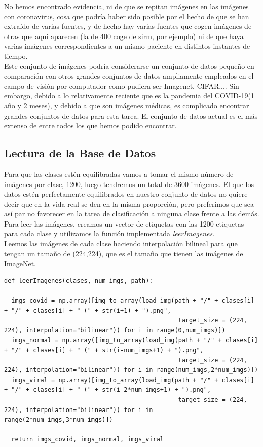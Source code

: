 \documentclass[11pt,a4paper]{article}
\theoremstyle{definition}
\begin{document}
No hemos encontrado evidencia,  ni de que se repitan imágenes en las imágenes con coronavirus,  cosa que podría haber sido posible por el hecho de que se han extraído de varias fuentes,  y de hecho hay varias fuentes que cogen imágenes de otras que aquí aparecen (la de 400 coge de sirm,  por ejemplo) ni de que haya varias imágenes correspondientes a un mismo paciente en distintos instantes de tiempo. \\

Este conjunto de imágenes podría considerarse un conjunto de datos pequeño en comparación con otros grandes conjuntos de datos ampliamente empleados en el campo de visión por computador como pudiera ser Imagenet, CIFAR,...  Sin embargo, debido a lo relativamente reciente que es la pandemia del COVID-19(1 año y 2 meses),  y debido a que son imágenes médicas, es complicado encontrar grandes conjuntos de datos para esta tarea. El conjunto de datos actual es el más extenso de entre todos los que hemos podido encontrar.

\subsection{Lectura de la Base de Datos}

Para que las clases estén equilibradas vamos a tomar el mismo número de imágenes por clase, 1200, luego tendremos un total de 3600 imágenes.  El que los datos estén perfectamente equilibrados en nuestro conjunto de datos no quiere decir que en la vida real se den en la misma proporción,  pero preferimos que sea así par no favorecer en la tarea de clasificación a ninguna clase frente a las demás.\\

Para leer las imágenes, creamos un vector de etiquetas con las 1200 etiquetas para cada clase y utilizamos la función implementada \textit{leerImagenes}.\\

Leemos las imágenes de cada clase haciendo interpolación bilineal para que tengan un tamaño de (224,224), que es el tamaño que tienen las imágenes de ImageNet.\\
\begin{lstlisting}
def leerImagenes(clases, num_imgs, path):

  imgs_covid = np.array([img_to_array(load_img(path + "/" + clases[i] + "/" + clases[i] + " (" + str(i+1) + ").png",
                                                target_size = (224, 224), interpolation="bilinear")) for i in range(0,num_imgs)])
  imgs_normal = np.array([img_to_array(load_img(path + "/" + clases[i] + "/" + clases[i] + " (" + str(i-num_imgs+1) + ").png",
                                                target_size = (224, 224), interpolation="bilinear")) for i in range(num_imgs,2*num_imgs)])
  imgs_viral = np.array([img_to_array(load_img(path + "/" + clases[i] + "/" + clases[i] + " (" + str(i-2*num_imgs+1) + ").png",
                                                target_size = (224, 224), interpolation="bilinear")) for i in range(2*num_imgs,3*num_imgs)])

  return imgs_covid, imgs_normal, imgs_viral
\end{lstlisting}
\end{document}

